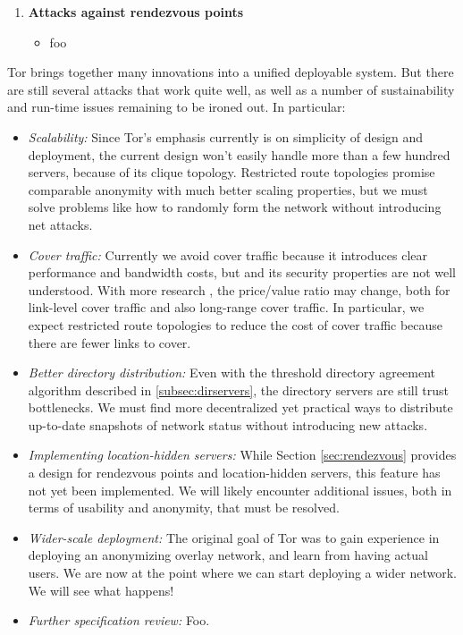 \documentclass[times,10pt,twocolumn]{article}
\begin{document}
\begin{enumerate}
\item \textbf{Attacks against rendezvous points}
\begin{itemize}
\item foo
\end{itemize}

\end{enumerate}


\label{sec:conclusion}


Tor brings together many innovations into
a unified deployable system. But there are still several attacks that
work quite well, as well as a number of sustainability and run-time
issues remaining to be ironed out. In particular:

\begin{itemize}
\item \emph{Scalability:} Since Tor's emphasis currently is on simplicity
of design and deployment, the current design won't easily handle more
than a few hundred servers, because of its clique topology. Restricted
route topologies \cite{danezis-pets03} promise comparable anonymity
with much better scaling properties, but we must solve problems like
how to randomly form the network without introducing net attacks.
\item \emph{Cover traffic:} Currently we avoid cover traffic because
it introduces clear performance and bandwidth costs, but and its
security properties are not well understood. With more research
\cite{SS03,defensive-dropping}, the price/value ratio may change, both for
link-level cover traffic and also long-range cover traffic. In particular,
we expect restricted route topologies to reduce the cost of cover traffic
because there are fewer links to cover.
\item \emph{Better directory distribution:} Even with the threshold
directory agreement algorithm described in \ref{subsec:dirservers},
the directory servers are still trust bottlenecks. We must find more
decentralized yet practical ways to distribute up-to-date snapshots of
network status without introducing new attacks.
\item \emph{Implementing location-hidden servers:} While Section
\ref{sec:rendezvous} provides a design for rendezvous points and
location-hidden servers, this feature has not yet been implemented.
We will likely encounter additional issues, both in terms of usability
and anonymity, that must be resolved.
\item \emph{Wider-scale deployment:} The original goal of Tor was to
gain experience in deploying an anonymizing overlay network, and learn
from having actual users. We are now at the point where we can start
deploying a wider network. We will see what happens!
\item \emph{Further specification review:} Foo.
\end{itemize}
\end{document}
